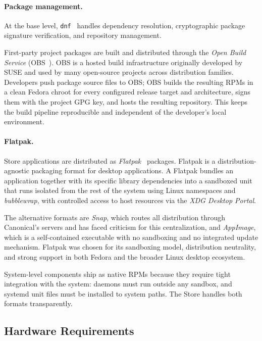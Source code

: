 \paragraph{Package management.}
At the base level, \texttt{dnf}~\cite{dnf} handles dependency resolution,
cryptographic package signature verification, and repository management.

First-party project packages are built and distributed through the \emph{Open
Build Service} (OBS~\cite{obs}). OBS is a hosted build infrastructure
originally developed by SUSE and used by many open-source projects across
distribution families. Developers push package source files to OBS; OBS builds
the resulting RPMs in a clean Fedora chroot for every configured release target
and architecture, signs them with the project GPG key, and hosts the resulting
repository. This keeps the build pipeline reproducible and independent of the
developer's local environment.

\paragraph{Flatpak.}
Store applications are distributed as
\emph{Flatpak}~\cite{archwiki:flatpak}
packages. Flatpak is a distribution-agnostic packaging format for desktop
applications. A Flatpak bundles an application together with its specific
library dependencies into a sandboxed unit that runs isolated from the rest of
the system using Linux namespaces and \emph{bubblewrap}, with controlled access
to host resources via the \emph{XDG Desktop Portal}.

The alternative formats are \emph{Snap}, which routes all distribution through
Canonical's servers and has faced criticism for this centralization, and
\emph{AppImage}, which is a self-contained executable with no sandboxing and no
integrated update mechanism. Flatpak was chosen for its sandboxing model,
distribution neutrality, and strong support in both Fedora and the broader Linux
desktop ecosystem.

System-level components ship as native RPMs because they require tight
integration with the system: daemons must run outside any sandbox, and systemd
unit files must be installed to system paths. The Store handles both formats
transparently.

\subsection{Hardware Requirements}
\label{sec:hardware}


